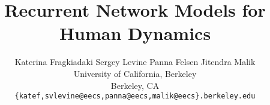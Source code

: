\documentclass[10pt,twocolumn,letterpaper]{article}
\begin{document}

\title{Recurrent Network Models for Human Dynamics}
\author{Katerina Fragkiadaki \quad \quad Sergey Levine \quad \quad Panna Felsen \quad \quad Jitendra Malik\\
University of California, Berkeley\\
Berkeley, CA \\
{\tt\small \{katef,svlevine@eecs,panna@eecs,malik@eecs\}.berkeley.edu}
}


\maketitle
\end{document}
